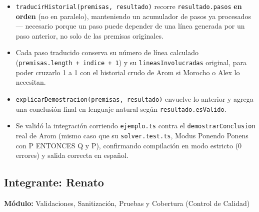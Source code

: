 \documentclass[11pt,a4paper,openany]{book}
\begin{document}
\begin{itemize}[leftmargin=*]
\item \texttt{traducirHistorial(premisas, resultado)} recorre \texttt{resultado.pasos} \textbf{en orden} (no en paralelo), manteniendo un acumulador de pasos ya procesados --- necesario porque un paso puede depender de una línea generada por un paso anterior, no solo de las premisas originales.
\item Cada paso traducido conserva su número de línea calculado (\texttt{premisas.length + indice + 1}) y su \texttt{lineasInvolucradas} original, para poder cruzarlo 1 a 1 con el historial crudo de Arom si Morocho o Alex lo necesitan.
\item \texttt{explicarDemostracion(premisas, resultado)} envuelve lo anterior y agrega una conclusión final en lenguaje natural según \texttt{resultado.esValido}.
\item Se validó la integración corriendo \texttt{ejemplo.ts} contra el \texttt{demostrarConclusion} real de Arom (mismo caso que su \texttt{solver.test.ts}, Modus Ponendo Ponens con P ENTONCES Q y P), confirmando compilación en modo estricto (0 errores) y salida correcta en español.
\end{itemize}

\subsection{Integrante: Renato}
\textbf{Módulo:} Validaciones, Sanitización, Pruebas y Cobertura (Control de Calidad)
\end{document}
